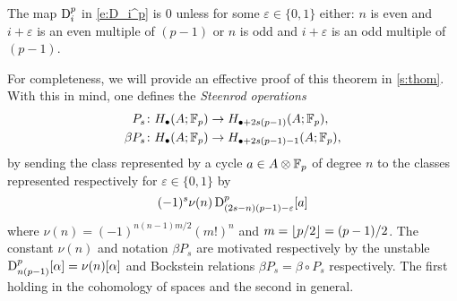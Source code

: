 \begin{theorem}[Thom]\label{t:thom}
	The map $\mathrm{D}_i^p$ in \eqref{e:D_i^p} is $0$ unless for some $\varepsilon \in \{0,1\}$ either: $n$ is even and $i+\varepsilon$ is an even multiple of $(p-1)$ or $n$ is odd and $i+\varepsilon$ is an odd multiple of $(p-1)$.
\end{theorem}
For completeness, we will provide an effective proof of this theorem in \cref{s:thom}.
With this in mind, one defines the \textit{Steenrod operations}
\begin{align*}
	P_s \colon& H_\bullet(A; {\mathbb{F}_p}) \to H_{\bullet + 2s(p-1)}(A; {\mathbb{F}_p}), \\
	\beta P_s \colon& H_\bullet(A; {\mathbb{F}_p}) \to H_{\bullet + 2s(p-1) - 1}(A; {\mathbb{F}_p}),
\end{align*}
by sending the class represented by a cycle $a \in A \otimes {\mathbb{F}_p}$ of degree $n$ to the classes represented respectively for $\varepsilon \in \{0,1\}$ by
\begin{equation*}
	(-1)^s \nu(n) \, \mathrm{D}^p_{(2s-n)(p-1)-\varepsilon}[a]
\end{equation*}
where $\nu(n) = (-1)^{n(n-1)m/2}(m!)^n$ and $m = \lfloor p/2\rfloor = (p-1)/2$.
The constant $\nu(n)$ and notation $\beta P_s$ are motivated respectively by the unstable $\mathrm{D}_{n(p-1)}^p[\alpha] = \nu(n)[\alpha]$ and Bockstein relations $\beta P_s = \beta \circ P_s$ respectively.
The first holding in the cohomology of spaces and the second in general.